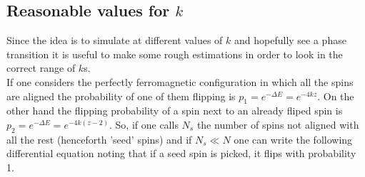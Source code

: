 \documentclass[a4paper, 11pt]{article}
\begin{document}


    \subsection{Reasonable values for $k$}
      Since the idea is to simulate at different values of $k$ and hopefully see a phase transition it is useful to make some rough estimations in order to look in the correct range of $k$s.\\
      If one considers the perfectly ferromagnetic configuration in which all the spins are aligned the probability of one of them flipping is $p_1 = e^{-\Delta E} = e^{-4kz}$.
      On the other hand the flipping probability of a spin next to an already fliped spin is $p_2 = e^{-\Delta E} = e^{-4k(z-2)}$.
      So, if one calls $N_{s}$ the number of spins not aligned with all the rest (henceforth 'seed' spins) and if $N_{s} \ll N$ one can write the following differential equation noting that if a seed spin is picked, it flips with probability 1.
\end{document}
